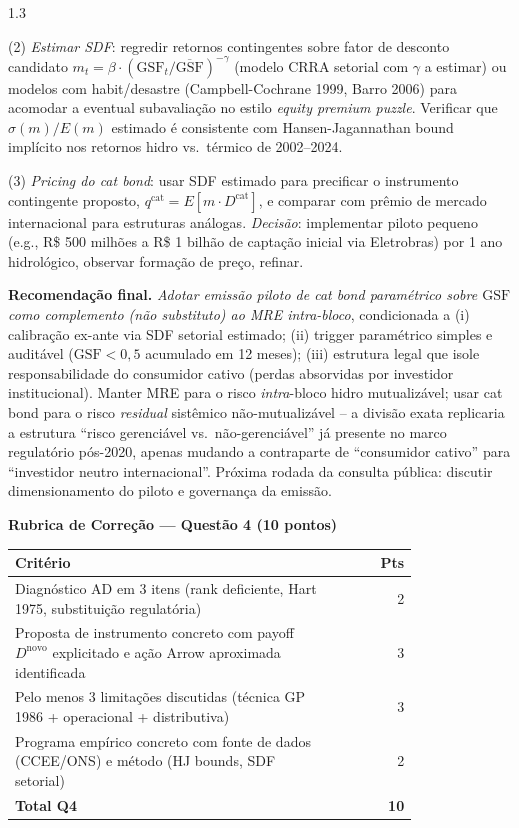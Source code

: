 \documentclass[11pt,addpoints]{exam}
\newcommand{\GSF}{\text{GSF}}
\begin{document}
\begin{spacing}{1.3}
\begin{questions}
\begin{solution}
(2) \emph{Estimar SDF}: regredir retornos contingentes sobre fator de desconto candidato $m_t = \beta\cdot (\GSF_t/\overline{\GSF})^{-\gamma}$ (modelo CRRA setorial com $\gamma$ a estimar) ou modelos com habit/desastre (Campbell-Cochrane 1999, Barro 2006) para acomodar a eventual subavaliação no estilo \emph{equity premium puzzle}. Verificar que $\sigma(m)/E(m)$ estimado é consistente com Hansen-Jagannathan bound implícito nos retornos hidro vs.\ térmico de 2002--2024.

(3) \emph{Pricing do cat bond}: usar SDF estimado para precificar o instrumento contingente proposto, $q^{\text{cat}} = E[m\cdot D^{\text{cat}}]$, e comparar com prêmio de mercado internacional para estruturas análogas. \emph{Decisão}: implementar piloto pequeno (e.g., R\$ 500 milhões a R\$ 1 bilhão de captação inicial via Eletrobras) por 1 ano hidrológico, observar formação de preço, refinar.

\textbf{Recomendação final.} \emph{Adotar emissão piloto de cat bond paramétrico sobre $\GSF$ como complemento (não substituto) ao MRE intra-bloco}, condicionada a (i) calibração ex-ante via SDF setorial estimado; (ii) trigger paramétrico simples e auditável ($\GSF < 0{,}5$ acumulado em 12 meses); (iii) estrutura legal que isole responsabilidade do consumidor cativo (perdas absorvidas por investidor institucional). Manter MRE para o risco \emph{intra}-bloco hidro mutualizável; usar cat bond para o risco \emph{residual} sistêmico não-mutualizável -- a divisão exata replicaria a estrutura ``risco gerenciável vs.\ não-gerenciável'' já presente no marco regulatório pós-2020, apenas mudando a contraparte de ``consumidor cativo'' para ``investidor neutro internacional''. Próxima rodada da consulta pública: discutir dimensionamento do piloto e governança da emissão.
\end{solution}

\ifprintanswers
\vspace{1em}
{\color{rubred}
\noindent\textbf{Rubrica de Correção --- Questão 4 (10 pontos)}
\vspace{0.3em}

\noindent\small
\begin{tabular}{@{}p{0.80\linewidth} r@{}}
\toprule
\textbf{Critério} & \textbf{Pts} \\
\midrule
Diagnóstico AD em 3 itens (rank deficiente, Hart 1975, substituição regulatória) & 2 \\
Proposta de instrumento concreto com payoff $D^{\text{novo}}$ explicitado e ação Arrow aproximada identificada & 3 \\
Pelo menos 3 limitações discutidas (técnica GP 1986 + operacional + distributiva) & 3 \\
Programa empírico concreto com fonte de dados (CCEE/ONS) e método (HJ bounds, SDF setorial) & 2 \\
\midrule
\textbf{Total Q4} & \textbf{10} \\
\bottomrule
\end{tabular}\normalsize
}
\fi

\end{questions}
\end{spacing}
\end{document}
